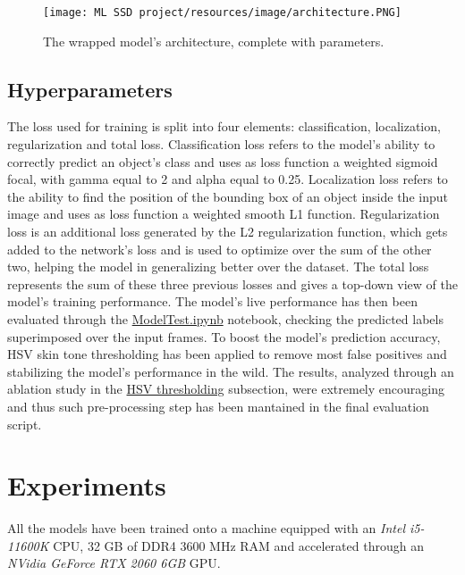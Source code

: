 \documentclass[10pt,twocolumn,letterpaper]{article}
\begin{document}
\begin{flushleft}
\begin{figure}[!h]
    \centering
    \texttt{[image: ML SSD project/resources/image/architecture.PNG]} \caption{The wrapped model's architecture, complete with parameters.}
\end{figure}
\label{figure4}

\end{flushleft}
\subsection{Hyperparameters}
\begin{flushleft}
The loss used for training is split into four elements: classification, localization, regularization and total loss.
Classification loss refers to the model's ability to correctly predict an object's class and uses as loss function a weighted sigmoid focal, with gamma equal to 2 and alpha equal to 0.25.
Localization loss refers to the ability to find the position of the bounding box of an object inside the input image and uses as loss function a weighted smooth L1 function.
Regularization loss is an additional loss generated by the L2 regularization function, which gets added to the network's loss and is used to optimize over the sum of the other two, helping the model in generalizing better over the dataset.
The total loss represents the sum of these three previous losses and gives a top-down view of the model's training performance.\linebreak
The model's live performance has then been evaluated through the \href{https://github.com/MarzioVallero/ML-Based-Blender-Gestural-Input-Interface/blob/master/ModelTest.ipynb}{ModelTest.ipynb} notebook, checking the predicted labels superimposed over the input frames.\linebreak
To boost the model's prediction accuracy, HSV skin tone thresholding has been applied to remove most false positives and stabilizing the model's performance in the wild. The results, analyzed through an ablation study in the \href{HSV}{HSV thresholding} subsection, were extremely encouraging and thus such pre-processing step has been mantained in the final evaluation script.

\end{flushleft}

\section{Experiments}
\begin{flushleft}
All the models have been trained onto a machine equipped with an \textit{Intel i5-11600K} CPU, 32 GB of DDR4 3600 MHz RAM and accelerated through an \textit{NVidia GeForce RTX 2060 6GB} GPU.
\end{flushleft}
\end{document}
